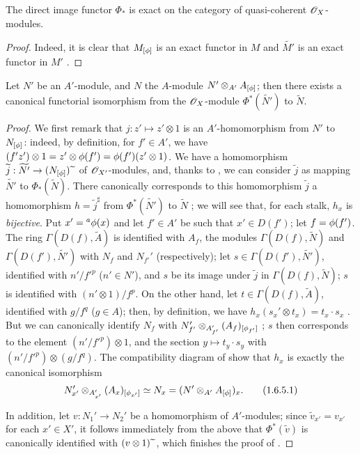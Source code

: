 \begin{corollary}[1.6.4]
\label{I.1.6.4}
The direct image functor $\Phi_*$ is exact on the category of quasi-coherent $\mathscr{O}_X$-modules.
\end{corollary}

\begin{proof}
Indeed, it is clear that $M_{[\phi]}$ is an exact functor in $M$ and $\widetilde{M'}$ is an
exact functor in $M'$ .
\end{proof}

\begin{proposition}[1.6.5]
\label{I.1.6.5}
Let $N'$ be an $A'$-module, and $N$ the $A$-module $N'\otimes_{A'}A_{[\phi]}$;
then there exists a canonical functorial isomorphism from the $\mathscr{O}_X$-module $\Phi^*(\widetilde{N'})$ to $\widetilde{N}$.
\end{proposition}

\begin{proof}
We first remark that $j:z'\mapsto z'\otimes 1$ is an $A'$-homomorphism from $N'$ to $N_{[\phi]}$: indeed, by definition, for $f'\in A'$, we have $(f' z')\otimes 1=z'\otimes\phi(f')=\phi(f')(z'\otimes 1)$.
We have  a homomorphism $\widetilde{j}:\widetilde{N'}\to(N_{[\vphi]})\supertilde$ of $\mathscr{O}_{X'}$-modules, and, thanks to , we can consider $\widetilde{j}$ as mapping $\widetilde{N'}$ to $\Phi_*(\widetilde{N})$.
There canonically corresponds to this homomorphism $\widetilde{j}$ a homomorphism $h=\widetilde{j}^\sharp$ from $\Phi^*(\widetilde{N'})$ to $\widetilde{N}$ ;
we will see that, for each stalk, $h_x$ is \emph{bijective}.
Put $x'={}^a\phi(x)$ and let $f'\in A'$ be such that $x'\in D(f')$;
let $f=\phi(f')$.
The ring $\Gamma(D(f),\widetilde{A})$ is identified with $A_f$, the modules
$\Gamma(D(f),\widetilde{N})$ and $\Gamma(D(f'),\widetilde{N'})$ with $N_f$ and $N_{f'}'$
(respectively);
let $s\in\Gamma(D(f'),\widetilde{N'})$, identified with $n'/{f'}^p$ ($n'\in N'$), and $s$ be its image under $\widetilde{j}$ in $\Gamma(D(f),\widetilde{N})$;
$s$ is identified with $(n'\otimes 1)/f^p$.
On the other hand, let $t\in\Gamma(D(f),\widetilde{A})$, identified with $g/f^q$ ($g\in A$);
then, by definition, we have $h_x(s_x'\otimes t_x)=t_x\cdot s_x$ .
But we can canonically identify $N_f$ with $N_{f'}'\otimes_{A_{f'}'}(A_f)_{[\phi_{f'}]}$ ;
$s$ then corresponds to the element $(n'/{f'}^p)\otimes 1$, and the section $y\mapsto t_y\cdot s_y$ with $(n'/{f'}^p)\otimes(g/f^q)$.
The compatibility diagram of  show that $h_x$ is exactly the canonical isomorphism
\[
  \label{I.1.6.5.1}
  N_{x'}'\otimes_{A_{x'}'}(A_x)_{[\phi_{x'}]}\simeq N_x=(N'\otimes_{A'}A_{[\phi]})_x.
  \tag{1.6.5.1}
\]

In addition, let $v:N_1'\to N_2'$ be a homomorphism of $A'$-modules;
since $\widetilde{v}_{x'}=v_{x'}$ for each $x'\in X'$, it follows immediately from the above that $\Phi^*(\widetilde{v})$ is canonically identified with $(v\otimes 1){\,\widetilde{\,}\,}$, which finishes the proof of .
\end{proof}

